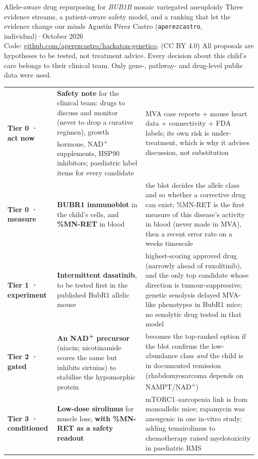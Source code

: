\documentclass[10pt]{article}
\begin{document}
{Allele-aware drug repurposing for \textit{BUB1B} mosaic variegated aneuploidy}
{Three evidence streams, a patient-aware safety model, and a ranking that let the evidence change our minds}
{Agustín Pérez Castro (\texttt{aperezcastro}, individual)\enspace·\enspace October 2026\\
Code: \href{https://github.com/aperezcastro/hackaton-genetico}{github.com/aperezcastro/hackaton-genetico},  (CC BY 4.0)}
{All proposals are hypotheses to be tested, not treatment advice. Every decision about this child's care belongs to
their clinical team. Only gene-, pathway- and drug-level public data were used.}

\begin{keybox}[title={Recommendations at a glance}]
\tablefont
\begin{tabularx}{\linewidth}{@{}P{2.55cm}P{5.1cm}L@{}}
\textbf{Tier 0 · act now} & \textbf{Safety note} for the clinical team: drugs to discuss and monitor (never to drop a curative regimen), growth hormone, NAD\textsuperscript{+} supplements, HSP90 inhibitors; paediatric label items for every candidate & MVA case reports + mouse heart data + connectivity + FDA labels; its own risk is under-treatment, which is why it advises discussion, not substitution\\
\textbf{Tier 0 · measure} & \textbf{BUBR1 immunoblot} in the child's cells, and \textbf{\%MN-RET} in blood & the blot decides the allele class and so whether a corrective drug can exist; \%MN-RET is the first measure of this disease's activity in blood (never made in MVA), then a recent error rate on a weeks timescale\\
\textbf{Tier 1 · experiment} & \textbf{Intermittent dasatinib}, to be tested first in the published BubR1 allelic mouse & highest-scoring approved drug (narrowly ahead of ruxolitinib), and the only top candidate whose direction is tumour-suppressive; genetic senolysis delayed MVA-like phenotypes in BubR1 mice; no senolytic drug tested in that model\\
\textbf{Tier 2 · gated} & \textbf{An NAD\textsuperscript{+} precursor} (niacin; nicotinamide scores the same but inhibits sirtuins) to stabilise the hypomorphic protein & becomes the top-ranked option if the blot confirms the low-abundance class \emph{and} the child is in documented remission (rhabdomyosarcoma depends on NAMPT/NAD\textsuperscript{+})\\
\textbf{Tier 3 · conditioned} & \textbf{Low-dose sirolimus} for muscle loss, \textbf{with \%MN-RET as a safety readout} & mTORC1–sarcopenia link is from monoallelic mice; rapamycin was aneugenic in one in-vitro study; adding temsirolimus to chemotherapy raised myelotoxicity in paediatric RMS\\

\end{tabularx}
\end{keybox}
\end{document}
